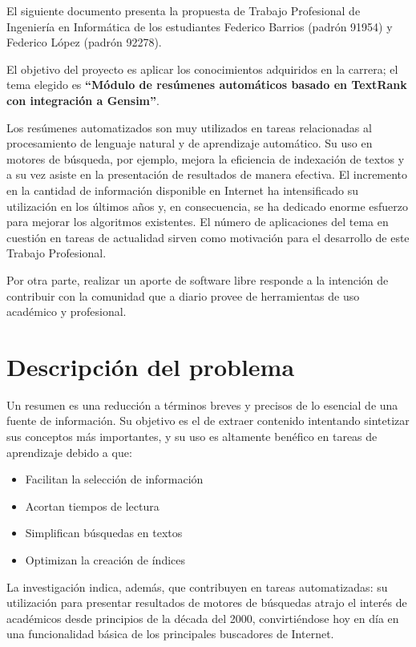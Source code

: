 \documentclass[12pt,a4paper]{article}
\begin{document}
El siguiente documento presenta la propuesta de Trabajo Profesional de Ingeniería en Informática de los estudiantes Federico Barrios (padrón 91954) y Federico López (padrón 92278).

El objetivo del proyecto es aplicar los conocimientos adquiridos en la carrera; el tema elegido es \textbf{``Módulo de resúmenes automáticos basado en TextRank con integración a Gensim''}.

Los resúmenes automatizados son muy utilizados en tareas relacionadas al procesamiento de lenguaje natural y de aprendizaje automático. Su uso en motores de búsqueda, por ejemplo, mejora la eficiencia de indexación de textos y a su vez asiste en la presentación de resultados de manera efectiva. El incremento en la cantidad de información disponible en Internet ha intensificado su utilización en los últimos años y, en consecuencia, se ha dedicado enorme esfuerzo para mejorar los algoritmos existentes. El número de aplicaciones del tema en cuestión en tareas de actualidad sirven como motivación para el desarrollo de este Trabajo Profesional.

Por otra parte, realizar un aporte de software libre responde a la intención de contribuir con la comunidad que a diario provee de herramientas de uso académico y profesional.

\section{Descripción del problema}

Un resumen es una reducción a términos breves y precisos de lo esencial de una fuente de información. Su objetivo es el de extraer contenido intentando sintetizar sus conceptos más importantes, y su uso es altamente benéfico en tareas de aprendizaje debido a que:
\begin{itemize}
    \item Facilitan la selección de información
    \item Acortan tiempos de lectura
    \item Simplifican búsquedas en textos
    \item Optimizan la creación de índices
\end{itemize}
La investigación indica, además, que contribuyen en tareas automatizadas: su utilización para presentar resultados de motores de búsquedas atrajo el interés de académicos desde principios de la década del 2000, convirtiéndose hoy en día en una funcionalidad básica de los principales buscadores de Internet.
\end{document}
